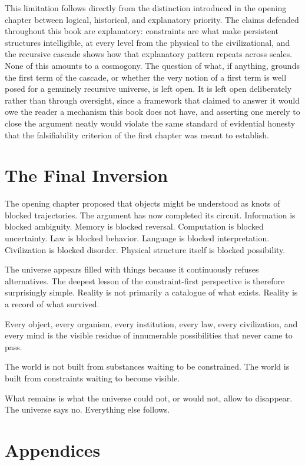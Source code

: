 \documentclass[11pt,oneside]{book}
\theoremstyle{plain}
\theoremstyle{definition}
\theoremstyle{remark}
\begin{document}
This limitation follows directly from the distinction introduced in the opening chapter between logical, historical, and explanatory priority. The claims defended throughout this book are explanatory: constraints are what make persistent structures intelligible, at every level from the physical to the civilizational, and the recursive cascade shows how that explanatory pattern repeats across scales. None of this amounts to a cosmogony. The question of what, if anything, grounds the first term of the cascade, or whether the very notion of a first term is well posed for a genuinely recursive universe, is left open. It is left open deliberately rather than through oversight, since a framework that claimed to answer it would owe the reader a mechanism this book does not have, and asserting one merely to close the argument neatly would violate the same standard of evidential honesty that the falsifiability criterion of the first chapter was meant to establish.

\section{The Final Inversion}

The opening chapter proposed that objects might be understood as knots of blocked trajectories. The argument has now completed its circuit. Information is blocked ambiguity. Memory is blocked reversal. Computation is blocked uncertainty. Law is blocked behavior. Language is blocked interpretation. Civilization is blocked disorder. Physical structure itself is blocked possibility.

The universe appears filled with things because it continuously refuses alternatives. The deepest lesson of the constraint-first perspective is therefore surprisingly simple. Reality is not primarily a catalogue of what exists. Reality is a record of what survived.

Every object, every organism, every institution, every law, every civilization, and every mind is the visible residue of innumerable possibilities that never came to pass.

The world is not built from substances waiting to be constrained. The world is built from constraints waiting to become visible.

What remains is what the universe could not, or would not, allow to disappear. The universe says no. Everything else follows.


\newpage 
\section*{Appendices}
\end{document}
